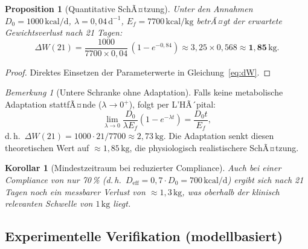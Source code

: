 ﻿\documentclass[12pt,a4paper]{article}
\theoremstyle{plain}
\newtheorem{proposition}[theorem]{Proposition}
\newtheorem{corollary}[theorem]{Korollar}
\theoremstyle{definition}
\theoremstyle{remark}
\newtheorem{remark}[theorem]{Bemerkung}
\begin{document}
\begin{proposition}[Quantitative SchÃ¤tzung]
\label{prop:quant}
Unter den Annahmen $D_0 = 1000\,\text{kcal/d}$,
$\lambda = 0{,}04\,\text{d}^{-1}$, $E_f = 7700\,\text{kcal/kg}$
betrÃ¤gt der erwartete Gewichtsverlust nach 21 Tagen:
\begin{equation}
  \Delta W(21) = \frac{1000}{7700 \times 0{,}04}\,(1-e^{-0{,}84})
  \approx 3{,}25 \times 0{,}568 \approx \mathbf{1{,}85}\,\text{kg}.
\end{equation}
\end{proposition}

\begin{proof}
Direktes Einsetzen der Parameterwerte in Gleichung~\eqref{eq:dW}.
\end{proof}

\begin{remark}[Untere Schranke ohne Adaptation]
Falls keine metabolische Adaptation stattfÃ¤nde ($\lambda \to 0^+$), folgt
per L'HÃ´pital:
\begin{equation}
  \lim_{\lambda \to 0} \frac{D_0}{\lambda E_f}(1-e^{-\lambda t}) = \frac{D_0 t}{E_f},
\end{equation}
d.\,h.\ $\Delta W(21) = 1000 \cdot 21 / 7700 \approx 2{,}73\,\text{kg}$.
Die Adaptation senkt diesen theoretischen Wert auf $\approx 1{,}85\,\text{kg}$,
die physiologisch realistischere SchÃ¤tzung.
\end{remark}

\begin{corollary}[Mindestzeitraum bei reduzierter Compliance]
Auch bei einer Compliance von nur 70\,\% (d.\,h.\
$D_\text{eff} = 0{,}7 \cdot D_0 = 700\,\text{kcal/d}$) ergibt sich nach 21 Tagen
noch ein messbarer Verlust von $\approx 1{,}3\,\text{kg}$, was oberhalb der
klinisch relevanten Schwelle von $1\,\text{kg}$ liegt.
\end{corollary}

\subsection{Experimentelle Verifikation (modellbasiert)}
\label{ssec:diet_exp}
\end{document}
